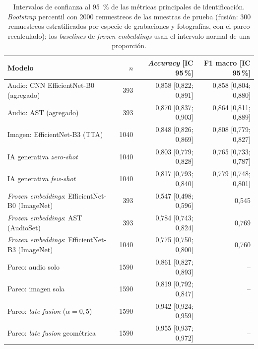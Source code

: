 \begin{table}[!htb]
  \centering\footnotesize
  \caption{Intervalos de confianza al \SI{95}{\percent} de las métricas principales de identificación. \textit{Bootstrap} percentil con \num{2000} remuestreos de las muestras de prueba (fusión: 300 remuestreos estratificados por especie de grabaciones y fotografías, con el pareo recalculado); los \textit{baselines} de \textit{frozen embeddings} usan el intervalo normal de una proporción.}
  \label{tab:ic}
  \begin{tabular}{@{}l r r r@{}}
    \toprule
    Modelo & $n$ & \textit{Accuracy} [IC 95\,\%] & F1 macro [IC 95\,\%] \\
    \midrule
    Audio: CNN EfficientNet-B0 (agregado) & 393 & 0,858 [0,822; 0,891] & 0,858 [0,804; 0,880] \\
    Audio: AST (agregado) & 393 & 0,870 [0,837; 0,903] & 0,864 [0,811; 0,889] \\
    Imagen: EfficientNet-B3 (TTA) & 1040 & 0,848 [0,826; 0,869] & 0,808 [0,779; 0,827] \\
    IA generativa \textit{zero-shot} & 1040 & 0,803 [0,779; 0,828] & 0,765 [0,733; 0,787] \\
    IA generativa \textit{few-shot} & 1040 & 0,817 [0,793; 0,840] & 0,779 [0,748; 0,801] \\
    \textit{Frozen embeddings}: EfficientNet-B0 (ImageNet) & 393 & 0,547 [0,498; 0,596] & 0,545 \\
    \textit{Frozen embeddings}: AST (AudioSet) & 393 & 0,784 [0,743; 0,824] & 0,769 \\
    \textit{Frozen embeddings}: EfficientNet-B3 (ImageNet) & 1040 & 0,775 [0,750; 0,800] & 0,760 \\
    Pareo: audio solo & 1590 & 0,861 [0,827; 0,893] & -- \\
    Pareo: imagen sola & 1590 & 0,819 [0,792; 0,847] & -- \\
    Pareo: \textit{late fusion} ($\alpha = 0{,}5$) & 1590 & 0,942 [0,924; 0,959] & -- \\
    Pareo: \textit{late fusion} geométrica & 1590 & 0,955 [0,937; 0,972] & -- \\
    \bottomrule
  \end{tabular}
\end{table}
